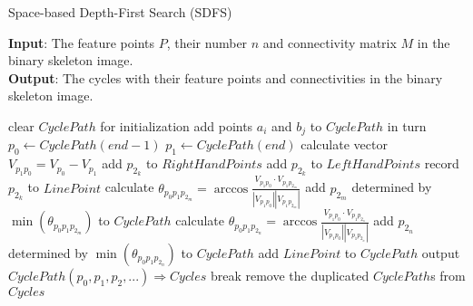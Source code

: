\documentclass[12pt]{article}
\begin{document}
\begin{algorithm}[!ht]
\caption{Space-based Depth-First Search (SDFS)}\label{alg:sdfs}
\textbf{Input}: The feature points $P$, their number $n$ and connectivity matrix $M$ in the binary skeleton image.\\
\textbf{Output}: The cycles with their feature points and connectivities in the binary skeleton image.
\begin{algorithmic}[1]
\STATE clear $CyclePath$ for initialization
\STATE add points $a_i$ and $b_j$ to $CyclePath$ in turn
\STATE $p_0\leftarrow CyclePath(end-1)$
\STATE $p_1\leftarrow CyclePath(end)$
\STATE calculate vector $V_{p_1p_0}=V_{p_0}-V_{p_1}$
\STATE add $p_{2_k}$ to $RightHandPoints$
\STATE add $p_{2_k}$ to $LeftHandPoints$
\ELSE
\STATE record $p_{2_k}$ to $LinePoint$
\ENDIF
\ENDFOR
{}
\STATE calculate $\theta_{p_0p_1p_{2_m}}=\arccos{\frac{V_{p_1p_0}\cdot V_{p_1p_{2_m}}}{\left|V_{p_1p_0}\right|\left|V_{p_1p_{2_m}}\right|}}$
\ENDFOR
\STATE add $p_{2_m}$ determined by $\min{\left(\theta_{p_0p_1p_{2_m}}\right)}$ to $CyclePath$
\STATE calculate $\theta_{p_0p_1p_{2_n}}=\arccos{\frac{V_{p_1p_0}\cdot V_{p_1p_{2_n}}}{\left|V_{p_1p_0}\right|\left|V_{p_1p_{2_n}}\right|}}$
\ENDFOR
\STATE add $p_{2_n}$ determined by $\min{\left(\theta_{p_0p_1p_{2_n}}\right)}$ to $CyclePath$
\ELSE
\STATE add $LinePoint$ to $CyclePath$
\ENDIF
{}
\IF {\textcolor{red}{$checkCyclePath(p_0,p_1,p_2,...)$}}
\STATE output $CyclePath(p_0,p_1,p_2,...) \Rightarrow Cycles$
\STATE break
\ENDIF
\ENDIF
\ENDWHILE
\ENDFOR  
\ENDFOR
\STATE remove the duplicated $CyclePath$s from $Cycles$
\end{algorithmic}
\end{algorithm}


\end{document}
